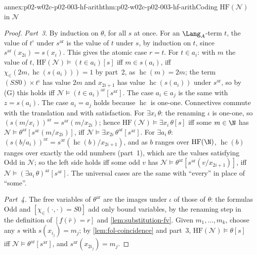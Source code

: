 \begin{annexitem}{annex:p02-w02c-p02-003-hf-arith}{thm:p02-w02c-p02-003-hf-arith}{Coding \(\mathrm{HF}(\mathcal N)\) in \(\mathcal N\)}
\begin{proof}
\emph{Part~3.}  By induction on \(\theta\), for all \(s\) at once.  For an
\(\Lang_A\)-term \(t\), the value of \(t^{\iota}\) under
\(s^{\mathrm{ar}}\) is the value of \(t\) under \(s\), by induction on \(t\),
since \(s^{\mathrm{ar}}(x_{2i})=s(x_i)\).  This gives the atomic case
\(r=t\).  For \(t\in a_i\): with \(m\) the value of \(t\),
\(\mathrm{HF}(\mathcal N)\models(t\in a_i)[s]\) iff \(m\in s(a_i)\), iff
\(\chi_{\in}(2m,\operatorname{hc}(s(a_i)))=1\) by part~2, as
\(\operatorname{hc}(m)=2m\); the term \((SS0)\times t^{\iota}\) has value
\(2m\) and \(x_{2i+1}\) has value \(\operatorname{hc}(s(a_i))\) under
\(s^{\mathrm{ar}}\), so by (G) this holds iff
\(\mathcal N\models(t\in a_i)^{\mathrm{ar}}[s^{\mathrm{ar}}]\).  The case
\(a_i\in a_j\) is the same with \(z=s(a_i)\).  The case \(a_i=a_j\) holds
because \(\operatorname{hc}\) is one-one.  Connectives commute with the
translation and with satisfaction.  For \(\exists x_i\,\theta\): the
renaming \(\iota\) is one-one, so
\((s(m/x_i))^{\mathrm{ar}}=s^{\mathrm{ar}}(m/x_{2i})\); hence
\(\mathrm{HF}(\mathcal N)\models\exists x_i\,\theta[s]\) iff some \(m\in\N\)
has \(\mathcal N\models\theta^{\mathrm{ar}}[s^{\mathrm{ar}}(m/x_{2i})]\),
iff \(\mathcal N\models\exists x_{2i}\,\theta^{\mathrm{ar}}[s^{\mathrm{ar}}]\).
For \(\exists a_i\,\theta\): \((s(b/a_i))^{\mathrm{ar}}
=s^{\mathrm{ar}}(\operatorname{hc}(b)/x_{2i+1})\), and as \(b\) ranges over
\(\mathrm{HF}(\N)\), \(\operatorname{hc}(b)\) ranges over exactly the odd
numbers (part~1), which are the values satisfying \(\mathrm{Odd}\) in
\(\mathcal N\); so the left side holds iff some odd \(v\) has
\(\mathcal N\models\theta^{\mathrm{ar}}[s^{\mathrm{ar}}(v/x_{2i+1})]\), iff
\(\mathcal N\models(\exists a_i\,\theta)^{\mathrm{ar}}[s^{\mathrm{ar}}]\).
The universal cases are the same with ``every'' in place of ``some''.

\emph{Part~4.}  The free variables of \(\theta^{\mathrm{ar}}\) are the images
under \(\iota\) of those of \(\theta\): the formulas \(\mathrm{Odd}\) and
\([\chi_{\in}(\cdot,\cdot)=S0]\) add only bound variables, by the renaming
step in the definition of \([f(\bar r)=r]\) and
\cref{lem:substitution-fv}.  Given \(m_1,\ldots,m_k\), choose any \(s\) with
\(s(x_{i_j})=m_j\); by \cref{lem:fol-coincidence} and part~3,
\(\mathrm{HF}(\mathcal N)\models\theta[s]\) iff
\(\mathcal N\models\theta^{\mathrm{ar}}[s^{\mathrm{ar}}]\), and
\(s^{\mathrm{ar}}(x_{2i_j})=m_j\).
\end{proof}
\end{annexitem}

